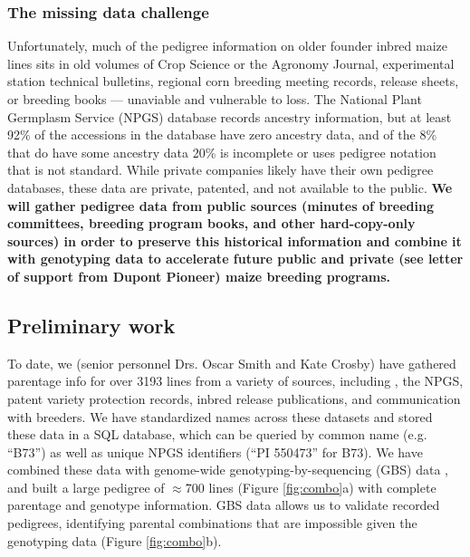 \documentclass[12pt]{article}
\begin{document}
\subsubsection*{The missing data challenge}

Unfortunately, much of the pedigree information on older founder inbred maize lines sits in old volumes of Crop Science or the Agronomy Journal, experimental station technical bulletins, regional corn breeding meeting records, release sheets, or breeding books --- unaviable and vulnerable to loss.  
The National Plant Germplasm Service (NPGS) database records ancestry information, but at least 92\% of the accessions in the database have zero ancestry data, and of the 8\% that do have some ancestry data 20\% is incomplete or uses pedigree notation that is not standard. 
While private companies likely have their own pedigree databases, these data are private, patented, and not available to the public. 
\textbf{We will gather pedigree data from public sources (minutes of breeding committees, breeding program books, and other hard-copy-only sources) in order to preserve this historical information and combine it with genotyping data to accelerate future public and private (see letter of support from Dupont Pioneer) maize breeding programs.}

\subsection*{Preliminary work}
To date, we (senior personnel Drs. Oscar Smith and Kate Crosby) have gathered parentage info for over 3193 lines from a variety of sources, including \cite{gerdes1993compilation}, the NPGS, patent variety protection records, inbred release publications, and communication with breeders.
We have standardized names across these datasets and stored these data in a SQL database, which can be queried by common name (e.g. ``B73'') as well as unique NPGS identifiers (``PI 550473'' for B73).
We have combined these data with genome-wide genotyping-by-sequencing (GBS) data \citep{romay2013comprehensive}, and built a large pedigree of $\approx$700 lines (Figure \ref{fig:combo}a) with complete parentage and genotype information. GBS data allows us to validate recorded pedigrees, identifying parental combinations that are impossible given the genotyping data (Figure \ref{fig:combo}b).
\end{document}
